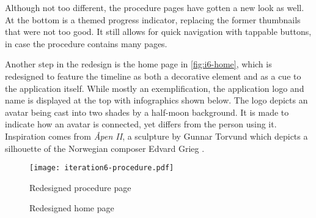 Although not too different, the procedure pages have gotten a new look as well. At the bottom is a themed progress indicator, replacing the former thumbnails that were not too good. It still allows for quick navigation with tappable buttons, in case the procedure contains many pages.

Another step in the redesign is the home page in \autoref{fig:i6-home}, which is redesigned to feature the timeline as both a decorative element and as a cue to the application itself. While mostly an exemplification, the application logo and name is displayed at the top with infographics shown below. The logo depicts an avatar being cast into two shades by a half-moon background. It is made to indicate how an avatar is connected, yet differs from the person using it. Inspiration comes from \emph{Åpen II}, a sculpture by Gunnar Torvund which depicts a silhouette of the Norwegian composer Edvard Grieg \autocite{vaage2014}.

\begin{sidewaysfigure}
    \centering
    \hspace{\fill}
    \begin{minipage}[t]{0.35\textwidth}
        \centering
        \vspace{0pt}
        \texttt{[image: iteration6-procedure.pdf]}
        \caption{Redesigned procedure page}
        \label{fig:i6-procedure}
    \end{minipage}
    \hspace{\fill}
    \begin{minipage}[t]{0.35\textwidth}
        \centering
        \vspace{0pt}
        \caption{Redesigned home page}
        \label{fig:i6-home}
    \end{minipage}
    \hspace*{\fill}
\end{sidewaysfigure}


